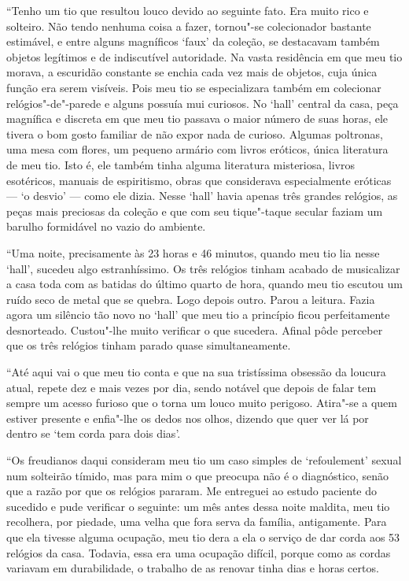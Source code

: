``Tenho um tio que resultou louco devido ao seguinte fato. Era muito
rico e solteiro. Não tendo nenhuma coisa a fazer, tornou"-se colecionador
bastante estimável, e entre alguns magníficos `faux' da coleção, se
destacavam também objetos legítimos e de indiscutível autoridade. Na
vasta residência em que meu tio morava, a escuridão constante se enchia
cada vez mais de objetos, cuja única função era serem visíveis. Pois meu
tio se especializara também em colecionar relógios"-de"-parede e alguns
possuía mui curiosos. No `hall' central da casa, peça magnífica e
discreta em que meu tio passava o maior número de suas horas, ele tivera
o bom gosto familiar de não expor nada de curioso. Algumas poltronas,
uma mesa com flores, um pequeno armário com livros eróticos, única
literatura de meu tio. Isto é, ele também tinha alguma literatura
misteriosa, livros esotéricos, manuais de espiritismo, obras que
considerava especialmente eróticas --- `o desvio' --- como ele dizia.
Nesse `hall' havia apenas três grandes relógios, as peças mais preciosas
da coleção e que com seu tique"-taque secular faziam um barulho
formidável no vazio do ambiente.

``Uma noite, precisamente às 23 horas e 46 minutos, quando meu tio lia
nesse `hall', sucedeu algo estranhíssimo. Os três relógios tinham
acabado de musicalizar a casa toda com as batidas do último quarto de
hora, quando meu tio escutou um ruído seco de metal que se quebra. Logo
depois outro. Parou a leitura. Fazia agora um silêncio tão novo no
`hall' que meu tio a princípio ficou perfeitamente desnorteado.
Custou"-lhe muito verificar o que sucedera. Afinal pôde perceber que os
três relógios tinham parado quase simultaneamente.

``Até aqui vai o que meu tio conta e que na sua tristíssima obsessão da
loucura atual, repete dez e mais vezes por dia, sendo notável que depois
de falar tem sempre um acesso furioso que o torna um louco muito
perigoso. Atira"-se a quem estiver presente e enfia"-lhe os dedos nos
olhos, dizendo que quer ver lá por dentro se `tem corda para dois dias'.

``Os freudianos daqui consideram meu tio um caso simples de
`refoulement' sexual num solteirão tímido, mas para mim o que preocupa
não é o diagnóstico, senão que a razão por que os relógios pararam. Me
entreguei ao estudo paciente do sucedido e pude verificar o seguinte: um
mês antes dessa noite maldita, meu tio recolhera, por piedade, uma velha
que fora serva da família, antigamente. Para que ela tivesse alguma
ocupação, meu tio dera a ela o serviço de dar corda aos 53 relógios da
casa. Todavia, essa era uma ocupação difícil, porque como as cordas
variavam em durabilidade, o trabalho de as renovar tinha dias e horas
certos.


